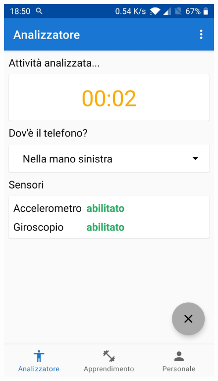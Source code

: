 \begin{figure}[H]
    \includegraphics[scale = 0.1019]{assets/images/screenshots/1b_Preparation.jpg}

\end{figure}
